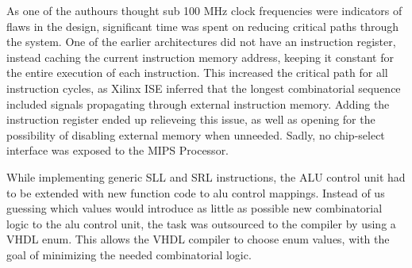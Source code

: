 As one of the authours thought sub 100 MHz clock frequencies were indicators of flaws in the design, significant time was spent on reducing critical paths through the system.
One of the earlier architectures did not have an instruction register, instead caching the current instruction memory address, keeping it constant for the entire execution of each instruction.
This increased the critical path for all instruction cycles, as Xilinx ISE inferred that the longest combinatorial sequence included signals propagating through external instruction memory.
Adding the instruction register ended up relieveing this issue, as well as opening for the possibility of disabling external memory when unneeded.
Sadly, no chip-select interface was exposed to the MIPS Processor.

While implementing generic SLL and SRL instructions, the ALU control unit had to be extended with new function code to alu control mappings.
Instead of us guessing which values would introduce as little as possible new combinatorial logic to the alu control unit, the task was outsourced to the compiler by using a VHDL enum.
This allows the VHDL compiler to choose enum values, with the goal of minimizing the needed combinatorial logic.
